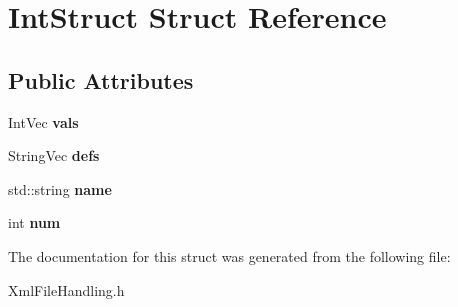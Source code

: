 \hypertarget{structIntStruct}{
\section{IntStruct Struct Reference}
\label{structIntStruct}
}
\subsection*{Public Attributes}
\begin{DoxyCompactItemize}
\item 
\hypertarget{structIntStruct_ae60ea69678bdcb56beadb29b4ba869f0}{
IntVec {\bfseries vals}}
\label{structIntStruct_ae60ea69678bdcb56beadb29b4ba869f0}

\item 
\hypertarget{structIntStruct_a2a47e58e158f2763090285140893b1e9}{
StringVec {\bfseries defs}}
\label{structIntStruct_a2a47e58e158f2763090285140893b1e9}

\item 
\hypertarget{structIntStruct_ad71cb2d1f1990d8bf8a4bf7e8dd45f3c}{
std::string {\bfseries name}}
\label{structIntStruct_ad71cb2d1f1990d8bf8a4bf7e8dd45f3c}

\item 
\hypertarget{structIntStruct_a6a0c3098aa24ab4b59ed78e69422f371}{
int {\bfseries num}}
\label{structIntStruct_a6a0c3098aa24ab4b59ed78e69422f371}

\end{DoxyCompactItemize}


The documentation for this struct was generated from the following file:\begin{DoxyCompactItemize}
\item 
XmlFileHandling.h\end{DoxyCompactItemize}
